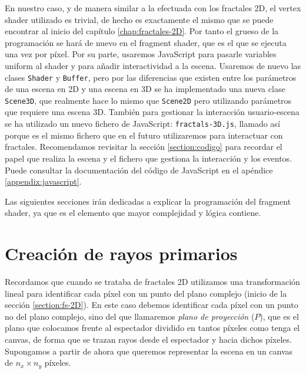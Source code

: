 En nuestro caso, y de manera similar a la efectuada con los fractales 2D, el vertex shader utilizado es trivial, de hecho es exactamente el mismo que se puede encontrar al inicio del capítulo \ref{chap:fractales-2D}. Por tanto el grueso de la programación se hará de nuevo en el fragment shader, que es el que se ejecuta una vez por píxel. Por su parte, usaremos JavaScript para pasarle variables uniform al shader y para añadir interactividad a la escena. Usaremos de nuevo las clases \verb|Shader| y \verb|Buffer|, pero por las diferencias que existen entre los parámetros de una escena en 2D y una escena en 3D se ha implementado una nueva clase \verb|Scene3D|, que realmente hace lo mismo que \verb|Scene2D| pero utilizando parámetros que requiere una escena 3D. También para gestionar la interacción usuario-escena se ha utilizado un nuevo fichero de JavaScript: \verb|fractals-3D.js|, llamado así porque es el mismo fichero que en el futuro utilizaremos para interactuar con fractales. Recomendamos revisitar la sección \ref{section:codigo} para recordar el papel que realiza la escena y el fichero que gestiona la interacción y los eventos. Puede consultar la documentación del código de JavaScript en el apéndice \ref{appendix:javascript}.

Las siguientes secciones irán dedicadas a explicar la programación del fragment shader, ya que es el elemento que mayor complejidad y lógica contiene.

\section{Creación de rayos primarios}
\label{section:rayo}

Recordamos que cuando se trataba de fractales 2D utilizamos una transformación lineal para identificar cada píxel con un punto del plano complejo (inicio de la sección \ref{section:fs-2D}). En este caso debemos identificar cada píxel con un punto no del plano complejo, sino del que llamaremos \textit{plano de proyección} ($P$), que es el plano que colocamos frente al espectador dividido en tantos píxeles como tenga el canvas, de forma que se trazan rayos desde el espectador y hacia dichos píxeles. Supongamos a partir de ahora que queremos representar la escena en un canvas de $n_x\times n_y$ píxeles.

